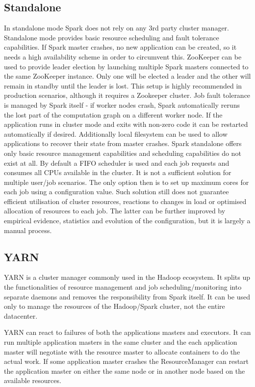 \documentclass[a4paper, 10 pt, conference]{IEEEtran}
\begin{document}
\subsection{Standalone}
In standalone mode Spark does not rely on any 3rd party cluster manager. Standalone mode provides basic resource scheduling and fault tolerance capabilities. If Spark master crashes, no new application can be created, so it needs a high availability scheme in order to circumvent this. ZooKeeper can be used to provide leader election by launching multiple Spark masters connected to the same ZooKeeper instance. Only one will be elected a leader and the other will remain in standby until the leader is lost. This setup is highly recommended in production scenarios, although it requires a Zookeeper cluster.
Job fault tolerance is managed by Spark itself - if worker nodes crash, Spark automatically reruns the lost part of the computation graph on a different worker node. If the application runs in cluster mode and exits with non-zero code it can be restarted automatically if desired.
Additionally local filesystem can be used to allow applications to recover their state from master crashes.
Spark standalone offers only basic resource management capabilities and scheduling capabilities do not exist at all. By default a FIFO scheduler is used and each job requests and consumes all CPUs available in the cluster. It is not a sufficient solution for multiple user/job scenarios. The only option then is to set up maximum cores for each job using a configuration value. Such solution still does not guarantee efficient utilisation of cluster resources, reactions to changes in load or optimised allocation of resources to each job. The latter can be further improved by empirical evidence, statistics and evolution of the configuration, but it is largely a manual process.

\subsection{YARN}
YARN is a cluster manager commonly used in the Hadoop ecosystem. It splits up the functionalities of resource management and job scheduling/monitoring into separate daemons and removes the responsibility from Spark itself. It can be used only to manage the resources of the Hadoop/Spark cluster, not the entire datacenter.

YARN can react to failures of both the applications masters and executors. It can run multiple application masters in the same cluster and the each application master will negotiate with the resource master to allocate containers to do the actual work. If some application master crashes the ResourceManager can restart the application master on either the same node or in another node based on the available resources.
\end{document}
